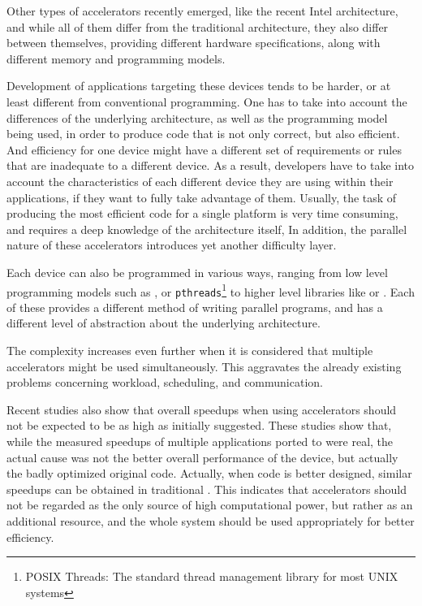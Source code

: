 \documentclass[main.tex]{subfiles}
\begin{document}
Other types of accelerators recently emerged, like the recent Intel \mic architecture, and while all of them differ from the traditional \cpu architecture, they also differ between themselves, providing different hardware specifications, along with different memory and programming models.

Development of applications targeting these devices tends to be harder, or at least different from conventional programming. One has to take into account the differences of the underlying architecture, as well as the programming model being used, in order to produce code that is not only correct, but also efficient. And efficiency for one device might have a different set of requirements or rules that are inadequate to a different device. As a result, developers have to take into account the characteristics of each different device they are using within their applications, if they want to fully take advantage of them. Usually, the task of producing the most efficient code for a single platform is very time consuming, and requires a deep knowledge of the architecture itself, In addition, the parallel nature of these accelerators introduces yet another difficulty layer.

Each device can also be programmed in various ways, ranging from low level programming models such as \cuda, \opencl or \texttt{pthreads}\footnote{POSIX Threads: The standard thread management library for most UNIX systems} to higher level libraries like \openmp or \openacc. Each of these provides a different method of writing parallel programs, and has a different level of abstraction about the underlying architecture.

The complexity increases even further when it is considered that multiple accelerators might be used simultaneously. This aggravates the already existing problems concerning workload, scheduling, and communication.

Recent studies \cite{lee2010debunking,bordawekar2010believe} also show that overall speedups when using accelerators should not be expected to be as high as initially suggested. These studies show that, while the measured speedups of multiple applications ported to \gpus were real, the actual cause was not the better overall performance of the device, but actually the badly optimized original \cpu code. Actually, when code is better designed, similar speedups can be obtained in traditional \cpus. This indicates that accelerators should not be regarded as the only source of high computational power, but rather as an additional resource, and the whole system should be used appropriately for better efficiency.
\end{document}
